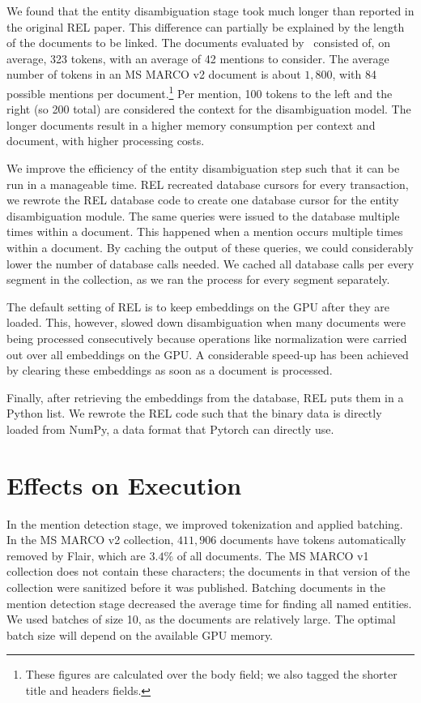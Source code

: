 We found that the entity disambiguation stage took much longer than reported in the original REL paper. This difference can partially be explained by the length of the documents to be linked. The documents evaluated by~\citet{rel} consisted of, on average, 323 tokens, with an average of 42 mentions to consider. The average number of tokens in an MS MARCO v2 document is about $1,800$, with 84 possible mentions per document.\footnote{These figures are calculated over the body field; we also tagged the shorter title and headers fields.}
Per mention, 100 tokens to the left and the right (so 200 total) are considered the context for the disambiguation model. 
The longer documents result in a higher memory consumption per context and document, with higher processing costs.

We improve the efficiency of the entity disambiguation step such that it can be run in a manageable time. REL recreated database cursors for every transaction, we rewrote the REL database code to create one database cursor for the entity disambiguation module. 
The same queries were issued to the database multiple times within a document. This happened when a mention occurs multiple times within a document. By caching the output of these queries, we could considerably lower the number of database calls needed. We cached all database calls per every segment in the collection, as we ran the process for every segment separately. 

The default setting of REL is to keep embeddings on the GPU after they are loaded. This, however, slowed down disambiguation when many documents were being processed consecutively because operations like normalization were carried out over all embeddings on the GPU. A considerable speed-up has been achieved by clearing these embeddings as soon as a document is processed.

Finally, after retrieving the embeddings from the database, REL puts them in a Python list. We rewrote the REL code such that the binary data is directly loaded from NumPy, a data format that Pytorch can directly use. 

\section{Effects on Execution}
In the mention detection stage, we improved tokenization and applied batching. In the MS MARCO v2 collection, $411,906$ documents have tokens automatically removed by Flair, which are $3.4\%$ of all documents. The MS MARCO v1 collection does not contain these characters; the documents in that version of the collection were sanitized before it was published.
Batching documents in the mention detection stage decreased the average time for finding all named entities. We used batches of size 10, as the documents are relatively large. The optimal batch size will depend on the available GPU memory.

